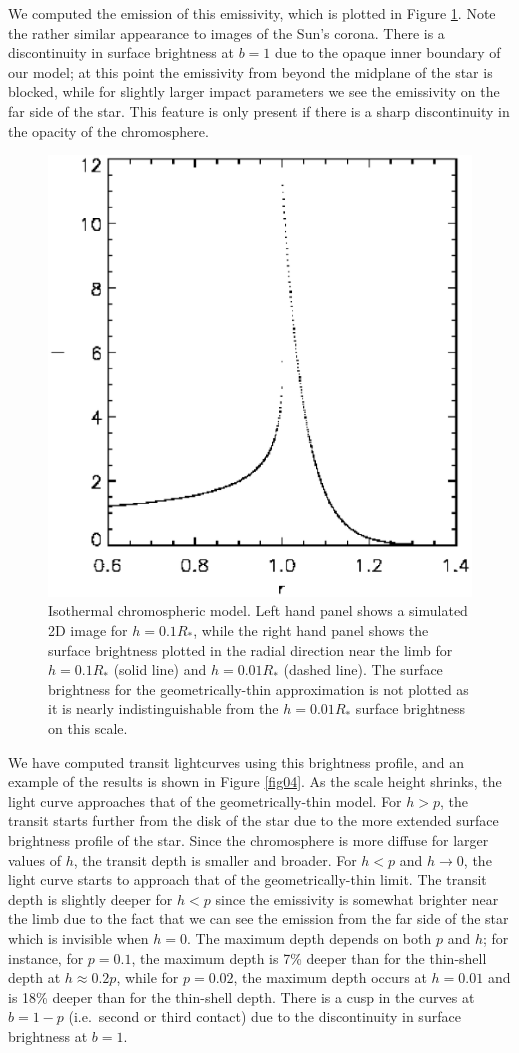 \documentclass[manuscript]{aastex}
\begin{document}
We computed the emission of this emissivity, which is plotted in
Figure \ref{fig03}.  Note the rather similar appearance to images of
the Sun's corona.  There is a discontinuity in surface brightness at
$b=1$ due to the opaque inner boundary of our model; at this point the
emissivity from beyond the midplane of the star is blocked, while for
slightly larger impact parameters we see the emissivity on the far
side of the star.  This feature is only present if there is a sharp
discontinuity in the opacity of the chromosphere.

\begin{figure}
\includegraphics[width=0.5 \textwidth]{chromosphere_surface_brightness.eps}
\caption{Isothermal chromospheric model. Left hand panel shows a simulated 2D
image for $h=0.1R_*$, while the right hand panel shows the
surface brightness plotted in the radial direction near
the limb for $h=0.1R_*$ (solid line) and $h=0.01R_*$
(dashed line).  The surface brightness for the geometrically-thin
approximation is not plotted as it is nearly indistinguishable from 
the $h=0.01R_*$ surface brightness on this scale.}
\label{fig03}
\end{figure}

We have computed transit lightcurves using this brightness
profile, and an example of the results is shown in Figure
\ref{fig04}.  As the scale height shrinks, the light
curve approaches that of the geometrically-thin model.
For $h > p$, the transit starts further from the disk of
the star due to the more extended surface brightness profile
of the star.  Since the chromosphere is more diffuse for
larger values of $h$, the transit depth is smaller and
broader.  For $h < p$ and $h \rightarrow 0$, the light curve 
starts  to approach that of the geometrically-thin limit.
The transit depth is slightly deeper for $h<p$ since the
emissivity is somewhat brighter near the limb due to
the fact that we can see the emission from the far side
of the star which is invisible when $h=0$.  The maximum
depth depends on both $p$ and $h$; for instance, for 
$p=0.1$, the maximum depth is 7\% deeper than for
the thin-shell depth at $h \approx 0.2 p$, while
for $p=0.02$, the maximum depth occurs at $h=0.01$
and is 18\% deeper than for the thin-shell depth.
There is a cusp in the curves at $b=1-p$ (i.e.\ second or third 
contact) due to the discontinuity in surface brightness at 
$b=1$.
\end{document}
